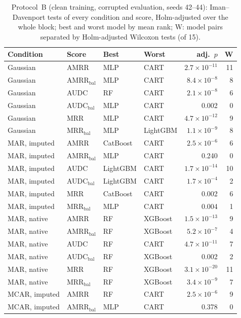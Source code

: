 \begin{table}[p]
\centering
\footnotesize
\caption{Protocol~B (clean training, corrupted evaluation, seeds 42--44): Iman--Davenport tests of every condition and score, Holm-adjusted over the whole block; best and worst model by mean rank; W: model pairs separated by Holm-adjusted Wilcoxon tests (of 15).}
\label{tab:protocolb_tests}
\begin{tabular}{@{}llllrr@{}}
\toprule
Condition & Score & Best & Worst & adj.\ $p$ & W \\
\midrule
Gaussian & AMRR & MLP & CART & $2.7\times10^{-11}$ & 11 \\
Gaussian & AMRR$_{\mathrm{bal}}$ & MLP & CART & $8.4\times10^{-8}$ & 8 \\
Gaussian & AUDC & RF & CART & $2.1\times10^{-8}$ & 6 \\
Gaussian & AUDC$_{\mathrm{bal}}$ & MLP & CART & 0.002 & 0 \\
Gaussian & MRR & MLP & CART & $4.7\times10^{-12}$ & 9 \\
Gaussian & MRR$_{\mathrm{bal}}$ & MLP & LightGBM & $1.1\times10^{-9}$ & 8 \\
MAR, imputed & AMRR & CatBoost & CART & $2.5\times10^{-6}$ & 6 \\
MAR, imputed & AMRR$_{\mathrm{bal}}$ & MLP & CART & 0.240 & 0 \\
MAR, imputed & AUDC & LightGBM & CART & $1.7\times10^{-14}$ & 10 \\
MAR, imputed & AUDC$_{\mathrm{bal}}$ & LightGBM & CART & $1.7\times10^{-4}$ & 2 \\
MAR, imputed & MRR & CatBoost & CART & 0.002 & 6 \\
MAR, imputed & MRR$_{\mathrm{bal}}$ & MLP & CART & 0.004 & 1 \\
MAR, native & AMRR & RF & XGBoost & $1.5\times10^{-13}$ & 9 \\
MAR, native & AMRR$_{\mathrm{bal}}$ & RF & XGBoost & $5.2\times10^{-7}$ & 4 \\
MAR, native & AUDC & RF & CART & $4.7\times10^{-11}$ & 7 \\
MAR, native & AUDC$_{\mathrm{bal}}$ & RF & XGBoost & 0.002 & 2 \\
MAR, native & MRR & RF & XGBoost & $3.1\times10^{-20}$ & 11 \\
MAR, native & MRR$_{\mathrm{bal}}$ & RF & XGBoost & $3.4\times10^{-9}$ & 7 \\
MCAR, imputed & AMRR & RF & CART & $2.5\times10^{-6}$ & 9 \\
MCAR, imputed & AMRR$_{\mathrm{bal}}$ & MLP & CART & 0.378 & 0 \\

\end{tabular}
\end{table}
